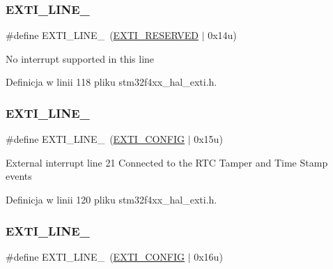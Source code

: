 \subsubsection{\texorpdfstring{E\+X\+T\+I\+\_\+\+L\+I\+N\+E\+\_}{EXTI\_LINE\_20}}
{\footnotesize\ttfamily \#define E\+X\+T\+I\+\_\+\+L\+I\+N\+E\+\_~(\hyperlink{group___e_x_t_i___private___constants_gac15c8e004a79171f659e6cba49e8a57a}{E\+X\+T\+I\+\_\+\+R\+E\+S\+E\+R\+V\+ED}   $\vert$ 0x14u)}

No interrupt supported in this line 

Definicja w linii 118 pliku stm32f4xx\+\_\+hal\+\_\+exti.\+h.

\mbox{\label{group___e_x_t_i___line_gaae9d458581e656ab574d6d56b9844587}} 
\subsubsection{\texorpdfstring{E\+X\+T\+I\+\_\+\+L\+I\+N\+E\+\_}{EXTI\_LINE\_21}}
{\footnotesize\ttfamily \#define E\+X\+T\+I\+\_\+\+L\+I\+N\+E\+\_~(\hyperlink{group___e_x_t_i___private___constants_ga6f245ca02e17c1798fe43a66ea5b7fa4}{E\+X\+T\+I\+\_\+\+C\+O\+N\+F\+IG}     $\vert$ 0x15u)}

External interrupt line 21 Connected to the R\+TC Tamper and Time Stamp events 

Definicja w linii 120 pliku stm32f4xx\+\_\+hal\+\_\+exti.\+h.

\mbox{\label{group___e_x_t_i___line_gacf5c5aed8ca5e9a3a3128d314cbe1f7f}} 
\subsubsection{\texorpdfstring{E\+X\+T\+I\+\_\+\+L\+I\+N\+E\+\_}{EXTI\_LINE\_22}}
{\footnotesize\ttfamily \#define E\+X\+T\+I\+\_\+\+L\+I\+N\+E\+\_~(\hyperlink{group___e_x_t_i___private___constants_ga6f245ca02e17c1798fe43a66ea5b7fa4}{E\+X\+T\+I\+\_\+\+C\+O\+N\+F\+IG}     $\vert$ 0x16u)}

